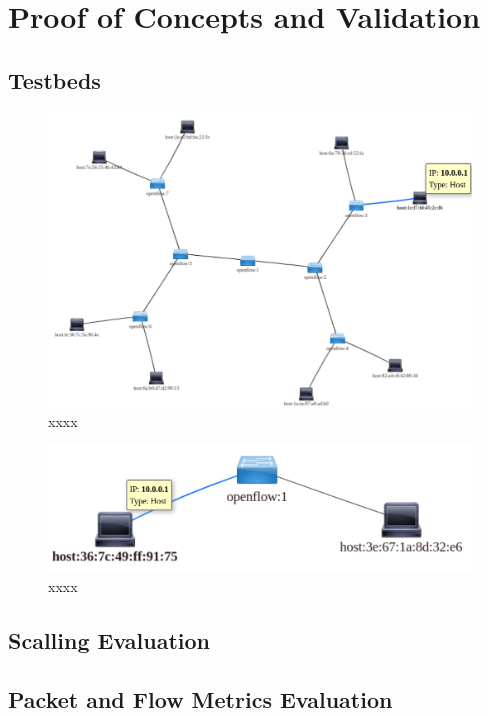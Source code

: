 \chapter{Proof of Concepts and Validation}

\section{Testbeds}

\begin{figure}[!ht]
	\centering
	\includegraphics[scale=0.4]{figures/ch5/topo-tree}
	\caption{xxxx}
	\label{fig:topo-tree}
\end{figure}

\begin{figure}[!ht]
	\centering
	\includegraphics[scale=0.4]{figures/ch5/topo-simple}
	\caption{xxxx}
	\label{fig:topo-simple}
\end{figure}

\section{Scalling Evaluation}


\section{Packet and Flow Metrics Evaluation}